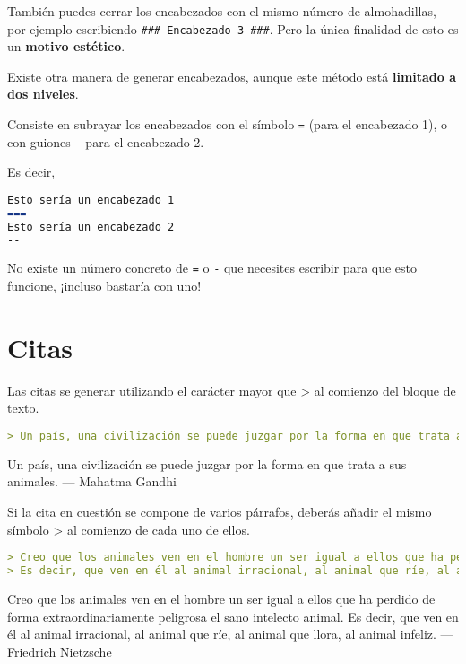 También puedes cerrar los encabezados con el mismo número de almohadillas, por ejemplo escribiendo \lstinline{### Encabezado 3 ###}. Pero la única finalidad de esto es un \textbf{motivo estético}.

Existe otra manera de generar encabezados, aunque este método está \textbf{limitado a dos niveles}.

Consiste en subrayar los encabezados con el símbolo \lstinline{=} (para el encabezado 1), o con guiones \lstinline{-} para el encabezado 2.

Es decir,

\begin{lstlisting}[language= md]
Esto sería un encabezado 1
===
Esto sería un encabezado 2
--
\end{lstlisting}

No existe un número concreto de \lstinline{=} o \lstinline{-} que necesites escribir para que esto funcione, ¡incluso bastaría con uno!

\section{Citas}

Las citas se generar utilizando el carácter mayor que > al comienzo del bloque de texto.

\begin{lstlisting}[language= md]
> Un país, una civilización se puede juzgar por la forma en que trata a sus animales.  — Mahatma Gandhi
\end{lstlisting}

\begin{displayquote}
 Un país, una civilización se puede juzgar por la forma en que trata a sus animales.  — Mahatma Gandhi
\end{displayquote}

Si la cita en cuestión se compone de varios párrafos, deberás añadir el mismo símbolo > al comienzo de cada uno de ellos.

\begin{lstlisting}[language= md]
> Creo que los animales ven en el hombre un ser igual a ellos que ha perdido de forma extraordinariamente peligrosa el sano intelecto animal.
> Es decir, que ven en él al animal irracional, al animal que ríe, al animal que llora, al animal infeliz. — Friedrich Nietzsche
\end{lstlisting}

\begin{displayquote}
 Creo que los animales ven en el hombre un ser igual a ellos que ha perdido de forma extraordinariamente peligrosa el sano intelecto animal.
 Es decir, que ven en él al animal irracional, al animal que ríe, al animal que llora, al animal infeliz. — Friedrich Nietzsche
\end{displayquote}

